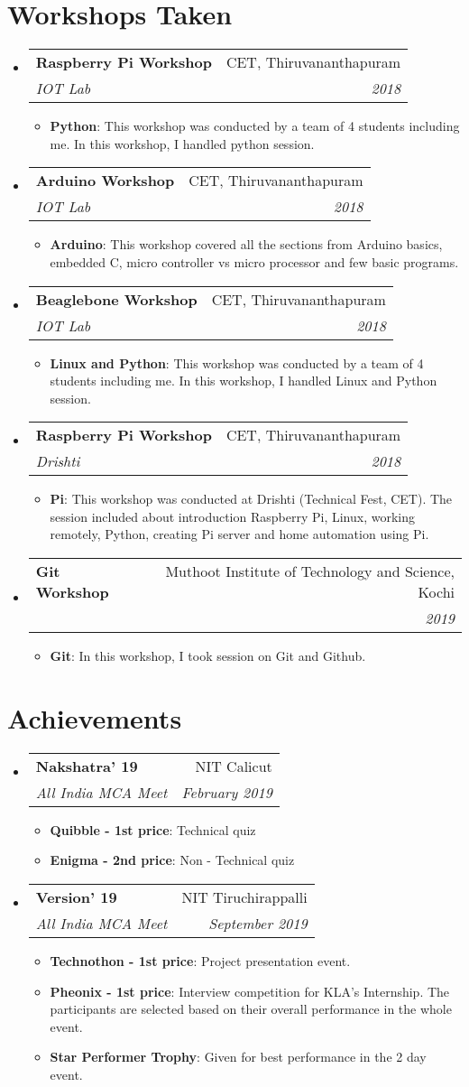 \documentclass[letterpaper,11pt]{article}
\makeatletter
\newcommand{\resumeItem}[2]{
	\item\small{
    		\textbf{#1}{: #2 \vspace{-2pt}}
  	}
}
\newcommand{\resumeSubheading}[4]{
  	\vspace{-1pt}\item
    	\begin{tabular*}{0.97\textwidth}[t]{l@{\extracolsep{\fill}}r}
      		\textbf{#1} & #2 \\
      		\textit{\small#3} & \textit{\small #4} \\
    	\end{tabular*}\vspace{-5pt}
}
\newcommand{\resumeSubHeadingListStart}{\begin{itemize}[leftmargin=*]}
\newcommand{\resumeSubHeadingListEnd}{\end{itemize}}
\newcommand{\resumeItemListStart}{\begin{itemize}}
\newcommand{\resumeItemListEnd}{\end{itemize}\vspace{-5pt}}
\makeatother
\begin{document}
\section{Workshops Taken}
  	\resumeSubHeadingListStart
    		\resumeSubheading
     			{Raspberry Pi Workshop}{CET, Thiruvananthapuram}
      			{IOT Lab}{2018}
      			\resumeItemListStart
       				 \resumeItem{Python}
          				{This workshop was conducted by a team of 4 students including me. In this workshop, I handled python session.}
      			\resumeItemListEnd
      		\resumeSubheading
      			{Arduino Workshop}{CET, Thiruvananthapuram}
     			{IOT Lab}{2018}
      			\resumeItemListStart
        				\resumeItem{Arduino}
          				{This workshop covered all the sections from Arduino basics, embedded C, micro controller vs micro processor and few basic programs.}
     	 		\resumeItemListEnd
      		\resumeSubheading
     		 	{Beaglebone Workshop}{CET, Thiruvananthapuram}
      			{IOT Lab}{2018}
      			\resumeItemListStart
        				\resumeItem{Linux and Python}
          				{This workshop was conducted by a team of 4 students including me. In this workshop, I handled Linux and Python session.}
      			\resumeItemListEnd
      		\resumeSubheading
      			{Raspberry Pi Workshop}{CET, Thiruvananthapuram}
     			{Drishti}{2018}
      			\resumeItemListStart
        				\resumeItem{Pi}
          				{This workshop was conducted at Drishti (Technical Fest, CET). The session included about introduction Raspberry Pi, Linux, working remotely, Python, creating Pi server and home automation using Pi.}
      			\resumeItemListEnd
      		\resumeSubheading
     			 {Git Workshop}{Muthoot Institute of Technology and Science, Kochi}
      			{}{2019}
     	 		\resumeItemListStart
        				\resumeItem{Git}
          				{In this workshop, I took session on Git and Github.}
      			\resumeItemListEnd
 	 \resumeSubHeadingListEnd

\section{Achievements}
  	\resumeSubHeadingListStart
   		\resumeSubheading
      			{Nakshatra' 19}{NIT Calicut}
      			{All India MCA Meet}{February 2019}
			\resumeItemListStart
      				\resumeItem{Quibble - 1st price}
          				{Technical quiz}
				\resumeItem{Enigma - 2nd price}
          				{Non - Technical quiz}
       			\resumeItemListEnd
		\resumeSubheading
      			{Version' 19}{NIT Tiruchirappalli}
      			{All India MCA Meet}{September 2019}
			\resumeItemListStart
      				\resumeItem{Technothon - 1st price}
          				{Project presentation event.}
				\resumeItem{Pheonix - 1st price}
          				{Interview competition for KLA's Internship. The participants are selected based on their overall performance in the whole event.}
				\resumeItem{Star Performer Trophy}
          				{Given for best performance in the 2 day event.}
       			\resumeItemListEnd
  	\resumeSubHeadingListEnd
\end{document}
